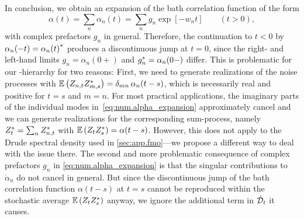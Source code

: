 In conclusion, we obtain an expansion of the bath correlation function of the form
\begin{equation}
  \alpha(t) = \sum_n \alpha_n(t) = \sum_n g_n \exp[-w_n t] \qquad (t > 0),
  \label{eq:num.alpha_expansion}
\end{equation}
with complex prefactors $g_n$ in general.
Therefore, the continuation to $t < 0$ by $\alpha_n(-t) = {\alpha_n(t)}^*$ produces a discontinuous jump at $t = 0$, since the right- and left-hand limits $g_n = \alpha_n(0+)$ and ${g}^*_n = \alpha_n(0-)$ differ.
This is problematic for our \NMSSE-hierarchy for two reasons:
First, we need to generate realizations of the noise processes with $\E[Z_{n,t} \ZZ_{m,s}] = \delta_{mn}\,\alpha_n(t - s)$, which is necessarily real and positive for $t = s$ and $m = n$.
For most practical applications, the imaginary parts of the individual modes in~\ref{eq:num.alpha_expansion} approximately cancel and we can generate realizations for the corresponding sum-process, namely ${Z}^*_t = \sum_n {Z}^*_{n,t}$ with $\E[Z_t \ZZ_s] = \alpha(t - s)$.
However, this does not apply to the Drude spectral density used in \autoref{sec:app.fmo}---we propose a different way to deal with the issue there.
The second and more problematic consequence of complex prefactors $g_n$ in \autoref{eq:num.alpha_expansion} is that the singular contributions to $\dot\alpha_n$ do not cancel in general.
But since the discontinuous jump of the bath correlation function $\alpha(t-s)$ at $t=s$ cannot be reproduced within the stochastic average $\E[Z_t\ZZ_s]$ anyway, we ignore the additional term in $\dot{\mathcal{D}}_t$ it causes.




